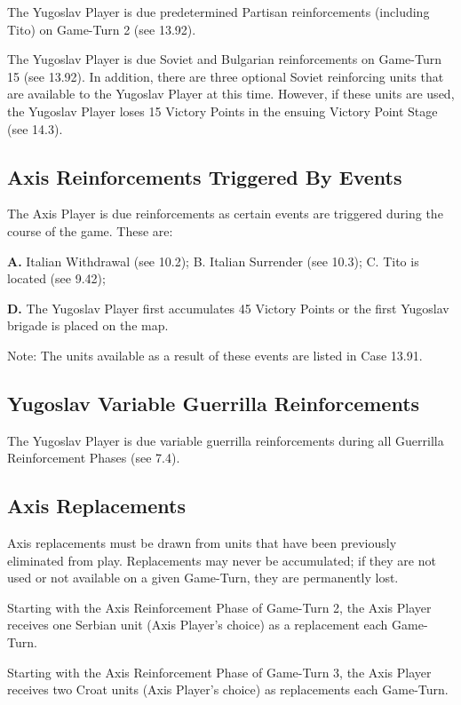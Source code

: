  The Yugoslav Player is due predetermined Partisan reinforcements (including Tito) on Game-Turn 2 (see 13.92).

 The Yugoslav Player is due Soviet and Bulgarian reinforcements on Game-Turn 15 (see 13.92). In addition, there are three optional Soviet reinforcing units that are available to the Yugoslav Player at this time. However, if these units are used, the Yugoslav Player loses 15 Victory Points in the ensuing Victory Point Stage (see 14.3).

\subsection{Axis Reinforcements Triggered By Events}\label{sec:13.3}

The Axis Player is due reinforcements as certain events are triggered during the course of the game. These are:

\textbf{A.} Italian Withdrawal (see 10.2); B. Italian Surrender (see 10.3); C. Tito is located (see 9.42);

\textbf{D.} The Yugoslav Player first accumulates 45 Victory Points or the first Yugoslav brigade is placed on the map.

Note: The units available as a result of these events are listed in Case 13.91.

\subsection{Yugoslav Variable Guerrilla Reinforcements}\label{sec:13.4}

The Yugoslav Player is due variable guerrilla reinforcements during all Guerrilla Reinforcement Phases (see 7.4).

\subsection{Axis Replacements}\label{sec:13.5}

Axis replacements must be drawn from units that have been previously eliminated from play. Replacements may never be accumulated; if they are not used or not available on a given Game-Turn, they are permanently lost.

 Starting with the Axis Reinforcement Phase of Game-Turn 2, the Axis Player receives one Serbian unit (Axis Player’s choice) as a replacement each Game-Turn.

 Starting with the Axis Reinforcement Phase of Game-Turn 3, the Axis Player receives two Croat units (Axis Player’s choice) as replacements each Game-Turn.

